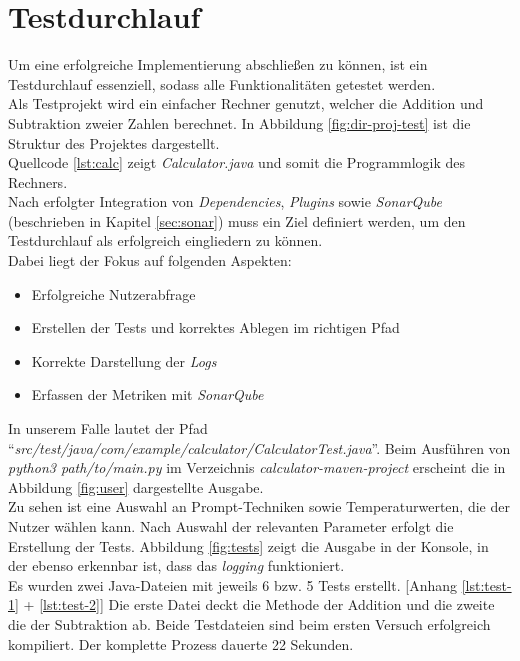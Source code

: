 \section{Testdurchlauf}
Um eine erfolgreiche Implementierung abschließen zu können, ist ein Testdurchlauf essenziell, sodass alle Funktionalitäten getestet werden.\\ Als Testprojekt wird ein einfacher Rechner genutzt, welcher die Addition und Subtraktion zweier Zahlen berechnet. In Abbildung \ref{fig:dir-proj-test} ist die Struktur des Projektes dargestellt.\\
Quellcode \ref{lst:calc} zeigt \textit{Calculator.java} und somit die Programmlogik des Rechners.\\
Nach erfolgter Integration von \textit{Dependencies}, \textit{Plugins} sowie \textit{SonarQube} (beschrieben in Kapitel \ref{sec:sonar}) muss ein Ziel definiert werden, um den Testdurchlauf als erfolgreich eingliedern zu können. \\
\vspace{-.3cm}
Dabei liegt der Fokus auf folgenden Aspekten:
\begin{itemize}
    \setlength{\parskip}{1pt}
    \item Erfolgreiche Nutzerabfrage
    \item Erstellen der Tests und korrektes Ablegen im richtigen Pfad
    \item Korrekte Darstellung der \textit{Logs}
    \item Erfassen der Metriken mit \textit{SonarQube}
\end{itemize}
In unserem Falle lautet der Pfad ``\textit{src/test/java/com/example/calculator/CalculatorTest.java}''.
Beim Ausführen von \textit{python3 path/to/main.py} im Verzeichnis \textit{calculator-maven-project} erscheint die in Abbildung \ref{fig:user} dargestellte Ausgabe.
\\
Zu sehen ist eine Auswahl an Prompt-Techniken sowie Temperaturwerten, die der Nutzer wählen kann.
Nach Auswahl der relevanten Parameter erfolgt die Erstellung der Tests. Abbildung \ref{fig:tests} zeigt die Ausgabe in der Konsole, in der ebenso erkennbar ist, dass das \textit{logging} funktioniert. \\Es wurden zwei Java-Dateien mit jeweils 6 bzw. 5 Tests erstellt. [Anhang \ref{lst:test-1} + \ref{lst:test-2}] Die erste Datei deckt die Methode der Addition und die zweite die der Subtraktion ab. Beide Testdateien sind beim ersten Versuch erfolgreich kompiliert. Der komplette Prozess dauerte 22 Sekunden.
